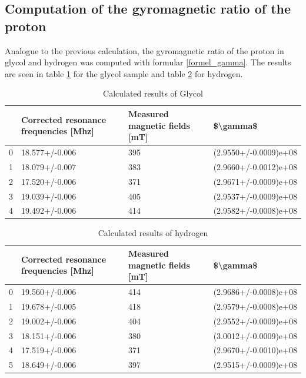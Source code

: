 \subsection{Computation of the gyromagnetic ratio of the proton}

Analogue to the previous calculation, the gyromagnetic ratio of the proton in glycol and hydrogen was computed with formular \ref{formel_gamma}. The results are seen in table \ref{glycol} for the glycol sample and table \ref{hydrogen} for hydrogen. 
\begin{table}[h]
	\caption{Calculated results of Glycol}
	\label{glycol}
	\begin{tabular}{llll}
		\toprule
		{} & Corrected resonance frequencies [Mhz] & Measured magnetic fields [mT] &               \$\textbackslash gamma\$ \\
		\midrule
		0 &                        18.577+/-0.006 &                           395 &  (2.9550+/-0.0009)e+08 \\
		1 &                        18.079+/-0.007 &                           383 &  (2.9660+/-0.0012)e+08 \\
		2 &                        17.520+/-0.006 &                           371 &  (2.9671+/-0.0009)e+08 \\
		3 &                        19.039+/-0.006 &                           405 &  (2.9537+/-0.0009)e+08 \\
		4 &                        19.492+/-0.006 &                           414 &  (2.9582+/-0.0008)e+08 \\
		\bottomrule
	\end{tabular}
\end{table}

\begin{table}
	\caption{Calculated results of hydrogen}
	\label{hydrogen}
	\begin{tabular}{llll}
		\toprule
		{} & Corrected resonance frequencies [Mhz] & Measured magnetic fields [mT] &               \$\textbackslash gamma\$ \\
		\midrule
		0 &                        19.560+/-0.006 &                           414 &  (2.9686+/-0.0008)e+08 \\
		1 &                        19.678+/-0.005 &                           418 &  (2.9579+/-0.0008)e+08 \\
		2 &                        19.002+/-0.006 &                           404 &  (2.9552+/-0.0009)e+08 \\
		3 &                        18.151+/-0.006 &                           380 &  (3.0012+/-0.0009)e+08 \\
		4 &                        17.519+/-0.006 &                           371 &  (2.9670+/-0.0010)e+08 \\
		5 &                        18.649+/-0.006 &                           397 &  (2.9515+/-0.0009)e+08 \\
		\bottomrule
	\end{tabular}
\end{table}